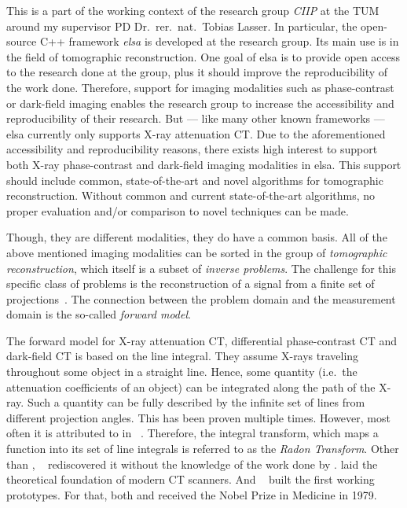 This is a part of the working context of the research group \textit{\gls{CIIP}} at the \gls{TUM}
around my supervisor PD Dr.\ rer.\ nat.\ Tobias Lasser. In particular, the open-source C++ framework
\textit{elsa} is developed at the research group. Its main use is in the field of tomographic
reconstruction. One goal of elsa is to provide open access to the research done at the group, plus
it should improve the reproducibility of the work done. Therefore, support for imaging modalities
such as phase-contrast or dark-field imaging enables the research group to increase the
accessibility and reproducibility of their research. But --- like many other known frameworks ---
elsa currently only supports X-ray attenuation CT\@. Due to the aforementioned accessibility and
reproducibility reasons, there exists high interest to support both X-ray phase-contrast and
dark-field imaging modalities in elsa. This support should include common, state-of-the-art and
novel algorithms for tomographic reconstruction. Without common and current state-of-the-art
algorithms, no proper evaluation and/or comparison to novel techniques can be made.

Though, they are different modalities, they do have a common basis. All of the above mentioned
imaging modalities can be sorted in the group of \textit{tomographic reconstruction}, which itself
is a subset of \textit{inverse problems}. The challenge for this specific class of problems is the
reconstruction of a signal from a finite set of projections~\cite{herman_basis_2015}. The connection
between the problem domain and the measurement domain is the so-called \textit{forward model}.

The forward model for X-ray attenuation CT, differential phase-contrast CT and dark-field CT is
based on the line integral. They assume X-rays traveling throughout some object in a straight line.
Hence, some quantity (i.e.\ the attenuation coefficients of an object) can be integrated along the
path of the X-ray. Such a quantity can be fully described by the infinite set of lines from
different projection angles. This has been proven multiple times. However, most often it is
attributed to \citeauthor*{radon_uber_1917} in \citeyear{radon_uber_1917} ~\cite{radon_uber_1917}.
Therefore, the integral transform, which maps a function into its set of line integrals is referred
to as the \textit{Radon Transform}. Other than \citeauthor*{radon_uber_1917},
\citeauthor*{cormack_representation_1963}~\cite{cormack_representation_1963} rediscovered it without
the knowledge of the work done by \citeauthor*{radon_uber_1917}.
\citeauthor*{cormack_representation_1963} laid the theoretical foundation of modern CT scanners. And
\citeauthor*{hounsfield_computerized_1973}~\cite{hounsfield_computerized_1973} built the first
working prototypes. For that, both \citeauthor*{cormack_representation_1963} and
\citeauthor*{hounsfield_computerized_1973} received the Nobel Prize in Medicine in 1979.

